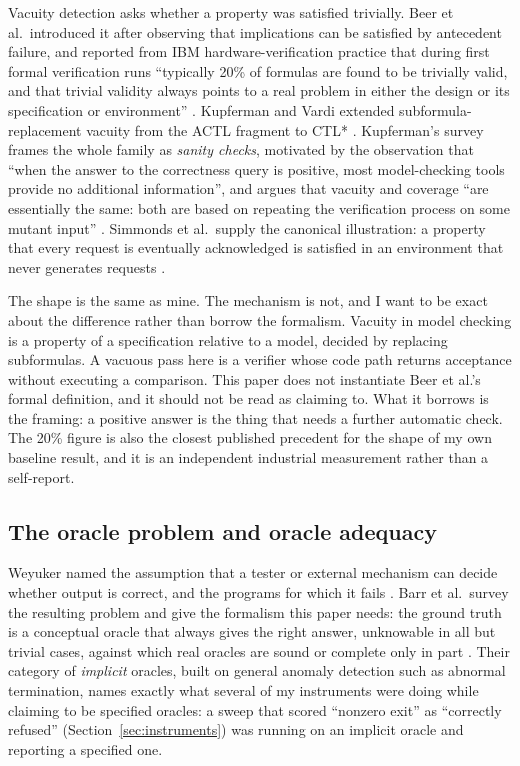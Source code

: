 \documentclass[11pt]{article}
\begin{document}
Vacuity detection asks whether a property was satisfied trivially. Beer et al.\ introduced
it after observing that implications can be satisfied by antecedent failure, and reported
from IBM hardware-verification practice that during first formal verification runs
``typically 20\% of formulas are found to be trivially valid, and that trivial validity
always points to a real problem in either the design or its specification or environment''
\citep{beer2001vacuity}. Kupferman and Vardi extended subformula-replacement vacuity from
the ACTL fragment to CTL* \citep{kupferman2003vacuity}. Kupferman's survey frames the whole
family as \emph{sanity checks}, motivated by the observation that ``when the answer to the
correctness query is positive, most model-checking tools provide no additional
information'', and argues that vacuity and coverage ``are essentially the same: both are
based on repeating the verification process on some mutant input''
\citep{kupferman2006sanity}. Simmonds et al.\ supply the canonical illustration: a property
that every request is eventually acknowledged is satisfied in an environment that never
generates requests \citep{simmonds2010vacuity}.

The shape is the same as mine. The mechanism is not, and I want to be exact about the
difference rather than borrow the formalism. Vacuity in model checking is a property of a
specification relative to a model, decided by replacing subformulas. A vacuous pass here is
a verifier whose code path returns acceptance without executing a comparison. This paper
does not instantiate Beer et al.'s formal definition, and it should not be read as claiming
to. What it borrows is the framing: a positive answer is the thing that needs a further
automatic check. The 20\% figure is also the closest published precedent for the shape of my
own baseline result, and it is an independent industrial measurement rather than a
self-report.

\subsection{The oracle problem and oracle adequacy}

Weyuker named the assumption that a tester or external mechanism can decide whether output
is correct, and the programs for which it fails \citep{weyuker1982nontestable}. Barr et al.\
survey the resulting problem and give the formalism this paper needs: the ground truth is a
conceptual oracle that always gives the right answer, unknowable in all but trivial cases,
against which real oracles are sound or complete only in part \citep{barr2015oracle}. Their
category of \emph{implicit} oracles, built on general anomaly detection such as abnormal
termination, names exactly what several of my instruments were doing while claiming to be
specified oracles: a sweep that scored ``nonzero exit'' as ``correctly refused''
(Section~\ref{sec:instruments}) was running on an implicit oracle and reporting a specified
one.
\end{document}
